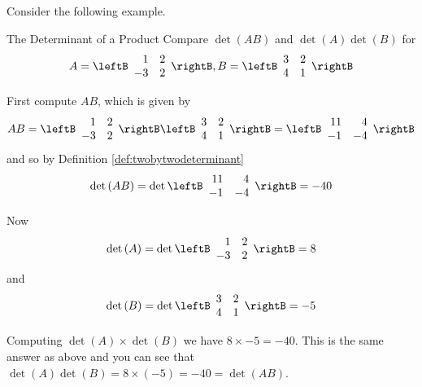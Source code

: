 Consider the following example.

\begin{example}{The Determinant of a Product}\label{exa:determinantofproduct}
Compare $\det \left( AB\right) $ and $\det \left( A\right) \det \left(
B\right) $ for
\begin{equation*}
A=\leftB
\begin{array}{rr}
1 & 2 \\
-3 & 2
\end{array}
\rightB ,B=\leftB
\begin{array}{rr}
3 & 2 \\
4 & 1
\end{array}
\rightB 
\end{equation*}
\end{example}

\begin{solution} First compute $AB$, which is given by 
\begin{equation*}
AB=\leftB
\begin{array}{rr}
1 & 2 \\
-3 & 2
\end{array}
\rightB \leftB
\begin{array}{rr}
3 & 2 \\
4 & 1
\end{array}
\rightB = \leftB
\begin{array}{rr}
11 & 4 \\
-1 & -4
\end{array}
\rightB
\end{equation*}
and so by Definition \ref{def:twobytwodeterminant}
\begin{equation*}
\det \left( AB\right) =\det \leftB
\begin{array}{rr}
11 & 4 \\
-1 & -4
\end{array}
\rightB = -40
\end{equation*}

Now
\begin{equation*}
\det \left( A\right) =\det \leftB
\begin{array}{rr}
1 & 2 \\
-3 & 2
\end{array}
\rightB = 8
\end{equation*}
and
\begin{equation*}
\det \left( B\right) =\det \leftB
\begin{array}{rr}
3 & 2 \\
4 & 1
\end{array}
\rightB = -5
\end{equation*}

Computing $\det \left(A\right) \times \det \left(B\right)$ we 
have $8 \times -5 = -40$. This is the same answer as above and 
you can see that $\det \left( A\right) \det \left( B\right) =8\times \left( -5\right)
=-40 = \det \left(AB\right)$. 
\end{solution}

